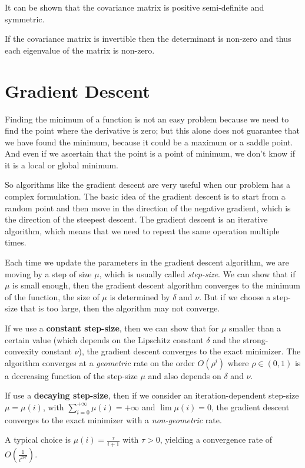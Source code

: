 It can be shown that the covariance matrix is positive semi-definite and symmetric.

If the covariance matrix is invertible then the determinant is non-zero and thus each eigenvalue of the matrix is non-zero.

\section{Gradient Descent}
Finding the minimum of a function is not an easy problem because we need to find the point where the derivative is zero; but this alone does not guarantee that we have found the minimum, because it could be a maximum or a saddle point. And even if we ascertain that the point is a point of minimum, we don't know if it is a local or global minimum.

So algorithms like the gradient descent are very useful when our problem has a complex formulation.
The basic idea of the gradient descent is to start from a random point and then move in the direction of the negative gradient, which is the direction of the steepest descent. The gradient descent is an iterative algorithm, which means that we need to repeat the same operation multiple times.

Each time we update the parameters in the gradient descent algorithm, we are moving by a step of size $\mu$, which is usually called \textit{step-size}. We can show that if $\mu$ is small enough, then the gradient descent algorithm converges to the minimum of the function, the size of $\mu $ is determined by $\delta$ and $\nu$.
But if we choose a step-size that is too large, then the algorithm may not converge.

If we use a \textbf{constant step-size}, then we can show that for $\mu$ smaller than a certain value (which depends on the Lipschitz constant $\delta$ and the strong-convexity constant $\nu$), the gradient descent converges to the exact minimizer. The algorithm converges at a \textit{geometric} rate on the order $O(\rho^i)$ where $\rho \in (0,1)$ is a decreasing function of the step-size $\mu$ and also depends on $\delta$ and $\nu$.

If use a \textbf{decaying step-size}, then if we consider an iteration-dependent step-size $\mu = \mu(i)$, with $\sum_{i=0}^{+\infty} \mu(i) = +\infty$ and $\lim \mu(i) = 0$, the gradient descent converges to the exact minimizer with a \textit{non-geometric} rate.

A typical choice is $\mu(i) = \frac{\tau}{i + 1}$ with $\tau > 0$, yielding a convergence rate of $O(\frac{1}{i^{2 \nu \tau}})$.



